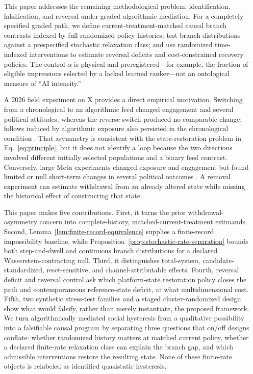 \documentclass[pdflatex,sn-mathphys-num]{sn-jnl}
\begin{document}
This paper addresses the remaining methodological problem: identification, falsification, and reversal under graded algorithmic mediation. For a completely specified graded path, we define current-treatment-matched causal branch contrasts indexed by full randomized policy histories; test branch distributions against a prespecified stochastic relaxation class; and use randomized time-indexed interventions to estimate reversal deficits and cost-constrained recovery policies. The control $\alpha$ is physical and preregistered---for example, the fraction of eligible impressions selected by a locked learned ranker---not an ontological measure of ``AI intensity.''

A 2026 field experiment on X provides a direct empirical motivation. Switching from a chronological to an algorithmic feed changed engagement and several political attitudes, whereas the reverse switch produced no comparable change; follows induced by algorithmic exposure also persisted in the chronological condition \cite{gauthier2026x}. That asymmetry is consistent with the state-restoration problem in Eq.~\eqref{eq:principle}, but it does not identify a loop because the two directions involved different initially selected populations and a binary feed contrast. Conversely, large Meta experiments changed exposure and engagement but found limited or null short-term changes in several political outcomes \cite{guess2023feeds,nyhan2023likeminded,gonzalez2023segregation,guess2023reshares}. A removal experiment can estimate withdrawal from an already altered state while missing the historical effect of constructing that state.

This paper makes five contributions. First, it turns the prior withdrawal-asymmetry concern into complete-history, matched-current-treatment estimands. Second, Lemma~\ref{lem:finite-record-equivalence} supplies a finite-record impossibility baseline, while Proposition~\ref{prop:stochastic-rate-separation} bounds both step-and-dwell and continuous branch distributions for a declared Wasserstein-contracting null. Third, it distinguishes total-system, candidate-standardized, reset-sensitive, and channel-attributable effects. Fourth, reversal deficit and reversal control ask which platform-state restoration policy closes the path and contemporaneous reference-state deficit, at what multidimensional cost. Fifth, two synthetic stress-test families and a staged cluster-randomized design show what would falsify, rather than merely instantiate, the proposed framework. We turn algorithmically mediated social hysteresis from a qualitative possibility into a falsifiable causal program by separating three questions that on/off designs conflate: whether randomized history matters at matched current policy, whether a declared finite-rate relaxation class can explain the branch gap, and which admissible interventions restore the resulting state. None of these finite-rate objects is relabeled as identified quasistatic hysteresis.
\end{document}
